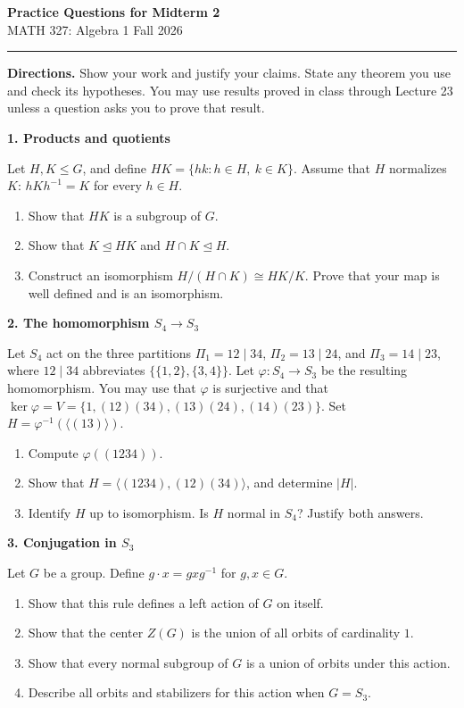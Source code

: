 \documentclass[11pt,letterpaper]{article}
\newcommand{\question}[1]{\par\medskip\noindent\textbf{#1}\par}
\begin{document}
\begin{center}
{\Large\bfseries Practice Questions for Midterm 2}\\[2pt]
MATH 327: Algebra 1 \quad\textbar\quad Fall 2026
\end{center}
\vspace{-5pt}
\hrule
\vspace{5pt}
\textbf{Directions.} Show your work and justify your claims. State any theorem you use and check its hypotheses. You may use results proved in class through Lecture 23 unless a question asks you to prove that result.

\question{1. Products and quotients}
Let $H,K\leq G$, and define $HK=\{hk:h\in H,\ k\in K\}$. Assume that $H$ normalizes $K$: $hKh^{-1}=K$ for every $h\in H$.
\begin{enumerate}[label=(\alph*)]
\item Show that $HK$ is a subgroup of $G$.
\item Show that $K\trianglelefteq HK$ and $H\cap K\trianglelefteq H$.
\item Construct an isomorphism $H/(H\cap K)\cong HK/K$. Prove that your map is well defined and is an isomorphism.
\end{enumerate}

\question{2. The homomorphism $S_4\to S_3$}
Let $S_4$ act on the three partitions $\Pi_1=12\mid34$, $\Pi_2=13\mid24$, and $\Pi_3=14\mid23$, where $12\mid34$ abbreviates $\{\{1,2\},\{3,4\}\}$. Let $\varphi:S_4\to S_3$ be the resulting homomorphism. You may use that $\varphi$ is surjective and that $\ker\varphi=V=\{1,(12)(34),(13)(24),(14)(23)\}$. Set $H=\varphi^{-1}(\langle(13)\rangle)$.
\begin{enumerate}[label=(\alph*)]
\item Compute $\varphi((1234))$.
\item Show that $H=\langle(1234),(12)(34)\rangle$, and determine $|H|$.
\item Identify $H$ up to isomorphism. Is $H$ normal in $S_4$? Justify both answers.
\end{enumerate}

\question{3. Conjugation in $S_3$}
Let $G$ be a group. Define $g\cdot x=gxg^{-1}$ for $g,x\in G$.
\begin{enumerate}[label=(\alph*)]
\item Show that this rule defines a left action of $G$ on itself.
\item Show that the center $Z(G)$ is the union of all orbits of cardinality $1$.
\item Show that every normal subgroup of $G$ is a union of orbits under this action.
\item Describe all orbits and stabilizers for this action when $G=S_3$.
\end{enumerate}
\end{document}
